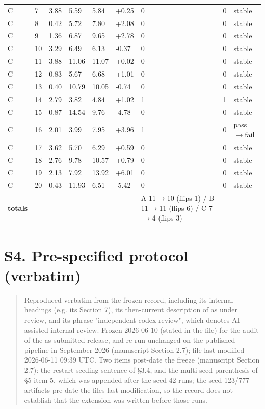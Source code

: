\documentclass[11pt,a4paper]{article}
\begin{document}
\begin{landscape}
{\begin{longtable}[]{@{}lllllllll@{}}
C & 7 & 3.88 & 5.59 & 5.84 & +0.25 & 0 & 0 & stable \\
C & 8 & 0.42 & 5.72 & 7.80 & +2.08 & 0 & 0 & stable \\
C & 9 & 1.36 & 6.87 & 9.65 & +2.78 & 0 & 0 & stable \\
C & 10 & 3.29 & 6.49 & 6.13 & -0.37 & 0 & 0 & stable \\
C & 11 & 3.88 & 11.06 & 11.07 & +0.02 & 0 & 0 & stable \\
C & 12 & 0.83 & 5.67 & 6.68 & +1.01 & 0 & 0 & stable \\
C & 13 & 0.40 & 10.79 & 10.05 & -0.74 & 0 & 0 & stable \\
C & 14 & 2.79 & 3.82 & 4.84 & +1.02 & 1 & 1 & stable \\
C & 15 & 0.87 & 14.54 & 9.76 & -4.78 & 0 & 0 & stable \\
C & 16 & 2.01 & 3.99 & 7.95 & +3.96 & 1 & 0 & pass\ensuremath{\rightarrow}fail \\
C & 17 & 3.62 & 5.70 & 6.29 & +0.59 & 0 & 0 & stable \\
C & 18 & 2.76 & 9.78 & 10.57 & +0.79 & 0 & 0 & stable \\
C & 19 & 2.13 & 7.92 & 13.92 & +6.01 & 0 & 0 & stable \\
C & 20 & 0.43 & 11.93 & 6.51 & -5.42 & 0 & 0 & stable \\
\textbf{totals} & & & & & & A 11\ensuremath{\rightarrow}10 (flips 1) / B 11\ensuremath{\rightarrow}11 (flips 6) / C 7\ensuremath{\rightarrow}4 (flips 3) & & \\
\end{longtable}
}
\endgroup
\end{landscape}

\section*{S4. Pre-specified protocol (verbatim)}

\begin{quote}
Reproduced verbatim from the frozen record, including its internal headings (e.g. its Section 7), its then-current description of \cite{choi20261} as under review, and its phrase "independent codex review", which denotes AI-assisted internal review. Frozen 2026-06-10 (stated in the file) for the audit of the as-submitted release, and re-run unchanged on the published pipeline in September 2026 (manuscript Section 2.7); file last modified 2026-06-11 09:39 UTC. Two items post-date the freeze (manuscript Section 2.7): the restart-seeding sentence of \S{}3.4, and the multi-seed parenthesis of \S{}5 item 5, which was appended after the seed-42 runs; the seed-123/777 artifacts pre-date the file\textquotesingle s last modification, so the record does not establish that the extension was written before those runs.
\end{quote}
\end{document}
